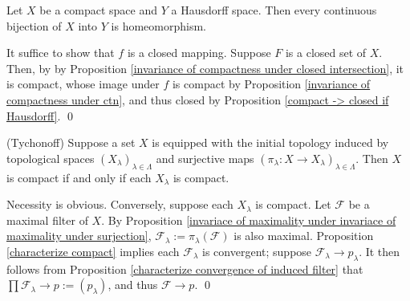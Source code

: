 \documentclass{report}
\begin{document}
\begin{prp}
    Let \( X \) be a compact space and \( Y \) a Hausdorff space.
    Then every continuous bijection of \( X \) into \( Y \) is homeomorphism.
\end{prp}
\begin{prf}
    It suffice to show that \( f \) is a closed mapping. Suppose \( F \) is a closed set of \( X \). Then, by by Proposition \ref{invariance of compactness under closed intersection}, it is compact, whose image under \( f \) is compact by Proposition \ref{invariance of compactness under ctn}, and thus closed by Proposition \ref{compact -> closed if Hausdorff}.
    \qed\end{prf}

\begin{thm} (Tychonoff)
    Suppose a set \( X \) is equipped with the initial topology induced by topological spaces \( (X_{\lambda})_{\lambda \in \Lambda} \) and surjective maps \( (\pi_{\lambda}: X \to X_{\lambda})_{\lambda \in \Lambda} \).
    Then \( X \) is compact if and only if each \( X_{\lambda} \) is compact.
\end{thm}
\begin{prf}
    Necessity is obvious. Conversely, suppose each \( X_{\lambda} \) is compact.
    Let \( \mathscr{F} \) be a maximal filter of \( X \). By Proposition \ref{invariace of maximality under invariace of maximality under surjection}, \( \mathscr{F}_{\lambda}:=\pi_{\lambda}(\mathscr{F}) \) is also maximal. Proposition \ref{characterize compact} implies each \( \mathscr{F}_{\lambda} \) is convergent; suppose \( \mathscr{F}_{\lambda}\to p_{\lambda} \). It then follows from Proposition \ref{characterize convergence of induced filter} that \( \prod \mathscr{F}_{\lambda} \to p:=(p_{\lambda})\), and thus \( \mathscr{F} \to p \).
    \qed\end{prf}
\end{document}

